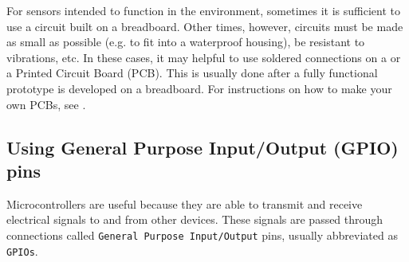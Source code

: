 %


%

\begin{kaobox}[frametitle=Board with circuit design \dots]
	For sensors intended to function in the environment, sometimes it is sufficient to use a circuit built on a breadboard. 
	Other times, however, circuits must be made as small as possible (e.g. to fit into a waterproof housing), be resistant to vibrations, etc.
	In these cases, it may helpful to use soldered connections on a  or a Printed Circuit Board (PCB). 
	This is usually done after a fully functional prototype is developed on a breadboard.
	For instructions on how to make your own PCBs, see .
\end{kaobox}%

\subsection{Using General Purpose Input/Output (GPIO) pins}
Microcontrollers are useful because they are able to transmit and receive electrical signals to and from other devices.
These signals are passed through connections called \texttt{General Purpose Input/Output} pins, usually abbreviated as \texttt{GPIOs}.  

